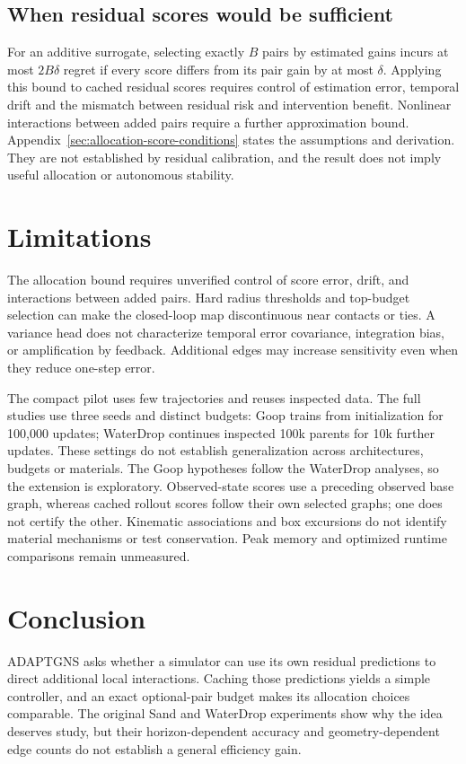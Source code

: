 \subsection{When residual scores would be sufficient}
For an additive surrogate, selecting exactly $B$ pairs by estimated gains incurs at most $2B\delta$ regret if every score differs from its pair gain by at most $\delta$. Applying this bound to cached residual scores requires control of estimation error, temporal drift and the mismatch between residual risk and intervention benefit. Nonlinear interactions between added pairs require a further approximation bound. Appendix~\ref{sec:allocation-score-conditions} states the assumptions and derivation. They are not established by residual calibration, and the result does not imply useful allocation or autonomous stability.


\section{Limitations}
The allocation bound requires unverified control of score error, drift, and interactions between added pairs. Hard radius thresholds and top-budget selection can make the closed-loop map discontinuous near contacts or ties. A variance head does not characterize temporal error covariance, integration bias, or amplification by feedback. Additional edges may increase sensitivity even when they reduce one-step error.

The compact pilot uses few trajectories and reuses inspected data. The full studies use three seeds and distinct budgets: Goop trains from initialization for 100,000 updates; WaterDrop continues inspected 100k parents for 10k further updates. These settings do not establish generalization across architectures, budgets or materials. The Goop hypotheses follow the WaterDrop analyses, so the extension is exploratory. Observed-state scores use a preceding observed base graph, whereas cached rollout scores follow their own selected graphs; one does not certify the other. Kinematic associations and box excursions do not identify material mechanisms or test conservation. Peak memory and optimized runtime comparisons remain unmeasured.

\section{Conclusion}
ADAPTGNS asks whether a simulator can use its own residual predictions to direct additional local interactions. Caching those predictions yields a simple controller, and an exact optional-pair budget makes its allocation choices comparable. The original Sand and WaterDrop experiments show why the idea deserves study, but their horizon-dependent accuracy and geometry-dependent edge counts do not establish a general efficiency gain.

